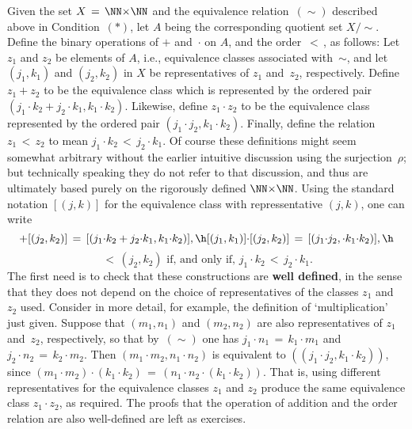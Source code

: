         Given the set $X \,=\, {\NN}{\times}{\NN}$ and the equivalence relation~$(\sim)$ described above in Condition~$({\ast})$,
    let $A$ being the corresponding quotient set $X/\sim$. Define the binary operations of $+$ and~${\cdot}$ on $A$, and the order $\,<\,$, as follows:
    Let $z_{1}$ and $z_{2}$ be elements of $A$, i.e., equivalence classes associated with~${\sim}$,
    and let $(j_{1},k_{1})$ and $(j_{2},k_{2})$ in $X$ be representatives of $z_{1}$ and~$z_{2}$, respectively.
    Define $z_{1} + z_{2}$ to be the equivalence class which is represented by the ordered pair $(j_{1}{\cdot}k_{2} + j_{2}{\cdot}k_{1}, k_{1}{\cdot}k_{2})$.
    Likewise, define $z_{1}{\cdot}z_{2}$ to be the equivalence class represented by the ordered pair $(j_{1}{\cdot}j_{2}, k_{1}{\cdot}k_{2})$.
    Finally, define the relation $z_{1}\,<\,z_{2}$ to mean $j_{1}{\cdot}k_{2}\,<\,j_{2}{\cdot}k_{1}$.
    Of course these definitions might seem somewhat arbitrary without the earlier intuitive discussion using the surjection~${\rho}$;
    but technically speaking they do not refer to that discussion, and thus are ultimately based purely on the rigorously defined ${\NN}{\times}{\NN}$.
    Using the standard notation $[(j,k)]$ for the equivalence class with repressentative $(j,k)$,
    one can write 
        \begin{displaymath}
        [(j_{1},k_{1})] + [(j_{2},k_{2})] \,=\, [(j_{1}{\cdot}k_{2} + j_{2}{\cdot}k_{1}, k_{1}{\cdot}k_{2})], \h
        [(j_{1},k_{1})]{\cdot}[(j_{2},k_{2})] \,=\, [(j_{1}{\cdot}j_{2},{\cdot} k_{1}{\cdot}k_{2})], \h
        \end{displaymath}
        \begin{displaymath}
        [(j_{1},k_{1})] \,<\, {(j_{2},k_{2})} \mbox{ if, and only if, }
        j_{1}{\cdot}k_{2}\,<\,j_{2}{\cdot}k_{1}.
        \end{displaymath}
    The first need is to check that these constructions are {\bf well defined},
    in the sense that they does not depend on the choice of representatives of the classes $z_{1}$ and~$z_{2}$ used.
    Consider in more detail, for example, the definition of `multiplication' just given.
    Suppose that $(m_{1}, n_{1})$ and $(m_{2}, n_{2})$ are also representatives of $z_{1}$ and~$z_{2}$, respectively,
    so that by~$(\sim)$ one has $j_{1}{\cdot}n_{1} \,=\, k_{1}{\cdot}m_{1}$ and $j_{2}{\cdot}n_{2} \,=\, k_{2}{\cdot}m_{2}$.
    Then $(m_{1}{\cdot}m_{2},n_{1}{\cdot}n_{2})$ is equivalent to $((j_{1}{\cdot}j_{2}, k_{1}{\cdot}k_{2}))$,
    since $(m_{1}{\cdot}m_{2}){\cdot}(k_{1}{\cdot}k_{2}) \,=\, (n_{1}{\cdot}n_{2}{\cdot}(k_{1}{\cdot}k_{2}))$.
    That is, using different representatives for the equivalence classes $z_{1}$ and $z_{2}$ produce the same equivalence class $z_{1}{\cdot}z_{2}$, as required.
    The proofs that the operation of addition and the order relation are also well-defined are left as exercises.

